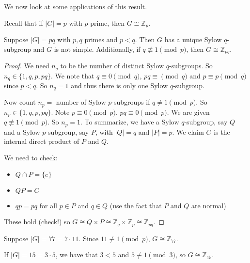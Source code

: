 We now look at some applications of this result.

Recall that if $|G|=p$ with $p$ prime, then $G\cong\mathbb Z_p$.

\begin{theorem}
	Suppose $|G|=pq$ with $p,q$ primes and $p<q$. Then $G$ has a unique Sylow $q$-subgroup and $G$ is not simple. Additionally, if $q\not\equiv 1\pmod p$, then $G\cong\mathbb Z_{pq}$.
\end{theorem}

\begin{proof}
	We need $n_q$ to be the number of distinct Sylow $q$-subgroups. So $n_q\in\{1,q,p,pq\}$. We note that $q\equiv 0\pmod q$, $pq\equiv \pmod q$ and $p\equiv p\pmod q$ since $p<q$. So $n_q=1$ and thus there is only one Sylow $q$-subgroup.

	Now count $n_p=$ number of Sylow $p$-subgroups if $q\neq 1\pmod p$. So $n_p\in\{1,q,p,pq\}$. Note $p\equiv 0\pmod p$, $pq\equiv 0\pmod p$. We are given $q\not\equiv 1\pmod p$. So $n_p=1$. To summarize, we have a Sylow $q$-subgroup, say $Q$ and a Sylow $p$-subgroup, say $P$, with $|Q|=q$ and $|P|=p$. We claim $G$ is the internal direct product of $P$ and $Q$.

	We need to check:
	\begin{itemize}
		\item $Q\cap P=\{e\}$
		\item $QP=G$
		\item $qp=pq$ for all $p\in P$ and $q\in Q$ (use the fact that $P$ and $Q$ are normal)
	\end{itemize}

	These hold (check!) so $G\cong Q\times P\cong\mathbb Z_q\times\mathbb Z_p\cong\mathbb Z_{pq}$.
\end{proof}

\begin{example}
	Suppose $|G|=77=7\cdot 11$. Since $11\not\equiv 1\pmod p$, $G\cong\mathbb Z_{77}$.
\end{example}

\begin{example}
	If $|G|=15=3\cdot 5$, we have that $3<5$ and $5\not\equiv 1\pmod 3$, so $G\cong\mathbb Z_{15}$.
\end{example}